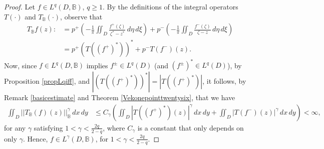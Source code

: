 \documentclass[suppldata]{interact}
\theoremstyle{plain}%
\theoremstyle{definition}
\theoremstyle{remark}
\newcommand{\bc}{\mathbb{B}}
\begin{document}
\begin{proof}
%
    

    Let $f \in L^q(D,\bc)$, $q\geq 1$. By the definitions of the integral operators $T(\cdot)$ and $T_\bc(\cdot)$, observe that
    \begin{align*}
    	 T_{\bc} f(z) :&= p^+\left(-\frac{1}{\pi} \iint_D \frac{f^+(\zeta)}{\zeta^* - z^*} \,d\eta\,d\xi \right) + p^-\left(- \frac{1}{\pi}\iint_{D} \frac{ f^-(\zeta)}{\zeta- z}\,d\eta\,d\xi \right) \\
	 &= p^+  ( T((f^+)^*))^*+ p^- T(f^-)(z).
    \end{align*}
    Now, since $f \in L^q(D,\bc)$ implies $f^\pm \in L^q(D)$ (and $(f^\pm)^* \in L^q(D)$), by Proposition \ref{propLqiff}, and $|(T((f^+)^*))^* |= |T((f^+)^*)|$, it follows, by Remark \ref{basicestimate} and Theorem \ref{Vekonepointtwentysix}, that we have
    \begin{align*}
    	\iint_{D} ||T_\bc(f)(z)||_{\bc}^\gamma\,dx\,dy
	&\leq C_\gamma\left( \iint_D |T((f^+)^*)(z) |^\gamma \,dx\,dy+ \iint_D |T(f^-)(z)|^\gamma \,dx\,dy\right) < \infty,
    \end{align*}
    for any $\gamma$ satisfying $1 < \gamma< \frac{2q}{2-q}$, where $C_\gamma$ is a constant that only depends on only $\gamma$. Hence, $f \in L^\gamma(D,\bc)$, for $1 < \gamma< \frac{2q}{2-q}$.  
    

\end{proof}
\end{document}
